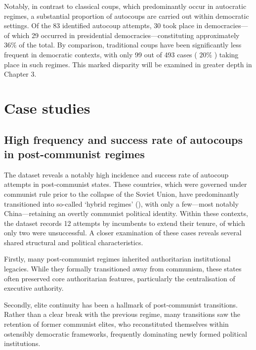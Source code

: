 \documentclass[
  12pt,
]{report}
\begin{document}
Notably, in contrast to classical coups, which predominantly occur in
autocratic regimes, a substantial proportion of autocoups are carried
out within democratic settings. Of the 83 identified autocoup attempts,
30 took place in democracies---of which 29 occurred in presidential
democracies---constituting approximately \(36\%\) of the total. By
comparison, traditional coups have been significantly less frequent in
democratic contexts, with only 99 out of 493 cases ( \(20\%\) ) taking
place in such regimes. This marked disparity will be examined in greater
depth in Chapter 3.

\section{Case studies}\label{case-studies}

\subsection*{High frequency and success rate of autocoups in
post-communist
regimes}\label{high-frequency-and-success-rate-of-autocoups-in-post-communist-regimes}

The dataset reveals a notably high incidence and success rate of
autocoup attempts in post-communist states. These countries, which were
governed under communist rule prior to the collapse of the Soviet Union,
have predominantly transitioned into so-called `hybrid regimes'
(), with only a
few---most notably China---retaining an overtly communist political
identity. Within these contexts, the dataset records 12 attempts by
incumbents to extend their tenure, of which only two were unsuccessful.
A closer examination of these cases reveals several shared structural
and political characteristics.

Firstly, many post-communist regimes inherited authoritarian
institutional legacies. While they formally transitioned away from
communism, these states often preserved core authoritarian features,
particularly the centralisation of executive authority.

Secondly, elite continuity has been a hallmark of post-communist
transitions. Rather than a clear break with the previous regime, many
transitions saw the retention of former communist elites, who
reconstituted themselves within ostensibly democratic frameworks,
frequently dominating newly formed political institutions.
\end{document}
